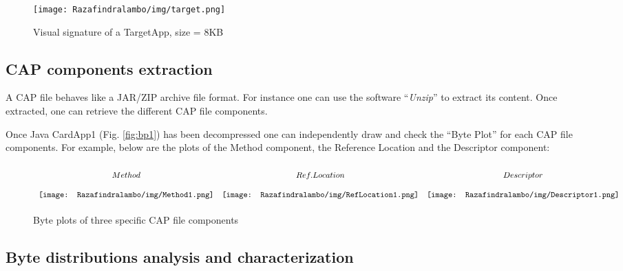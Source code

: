 \begin{figure}[!h]
    \center
    \texttt{[image: Razafindralambo/img/target.png]}
    \caption{Visual signature of a TargetApp, size = 8KB}
    \label{fig:bp2}
\end{figure}

\subsection{CAP components extraction}
A CAP file behaves like a JAR/ZIP archive file format. For instance one can use the software
``\textit{Unzip}'' to extract its content. Once extracted, one can retrieve the different CAP file
components.

Once Java CardApp1 (Fig. \ref{fig:bp1}) has been decompressed one can independently draw and check the ``Byte
Plot'' for each CAP file components. For example, below are the plots of the Method component, the
Reference Location and the Descriptor component:

\vspace{-3em}
\begin{figure}[!h]
\begin{center}
\[\arraycolsep=5pt\def\arraystretch{2}
\begin{array}{ccc}
Method & Ref. Location & Descriptor  \\    
\texttt{[image: Razafindralambo/img/Method1.png]} &
\texttt{[image: Razafindralambo/img/RefLocation1.png]} & 
\texttt{[image: Razafindralambo/img/Descriptor1.png]} 
\end{array}
\]
\caption{Byte plots of three specific CAP file components}
\label{fig:bpcompo}
\end{center}
\end{figure}

\vspace{-3em}
\subsection{Byte distributions analysis and characterization}
